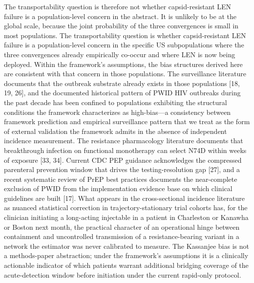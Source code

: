 \documentclass[12pt]{article}
\begin{document}
The transportability question is therefore not whether capsid-resistant LEN failure is a population-level concern in the abstract. It is unlikely to be at the global scale, because the joint probability of the three convergences is small in most populations. The transportability question is whether capsid-resistant LEN failure is a population-level concern in the specific US subpopulations where the three convergences already empirically co-occur and where LEN is now being deployed. Within the framework's assumptions, the bias structures derived here are consistent with that concern in those populations. The surveillance literature documents that the outbreak substrate already exists in those populations [18, 19, 26], and the documented historical pattern of PWID HIV outbreaks during the past decade has been confined to populations exhibiting the structural conditions the framework characterizes as high-bias---a consistency between framework prediction and empirical surveillance pattern that we treat as the form of external validation the framework admits in the absence of independent incidence measurement. The resistance pharmacology literature documents that breakthrough infection on functional monotherapy can select N74D within weeks of exposure [33, 34]. Current CDC PEP guidance acknowledges the compressed parenteral prevention window that drives the testing-resolution gap [27], and a recent systematic review of PrEP best practices documents the near-complete exclusion of PWID from the implementation evidence base on which clinical guidelines are built [17]. What appears in the cross-sectional incidence literature as nuanced statistical correction in trajectory-stationary trial cohorts has, for the clinician initiating a long-acting injectable in a patient in Charleston or Kanawha or Boston next month, the practical character of an operational hinge between containment and uncontrolled transmission of a resistance-bearing variant in a network the estimator was never calibrated to measure. The Kassanjee bias is not a methods-paper abstraction; under the framework's assumptions it is a clinically actionable indicator of which patients warrant additional bridging coverage of the acute-detection window before initiation under the current rapid-only protocol.
\end{document}
